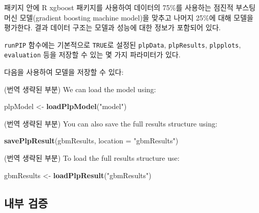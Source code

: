\documentclass[10.5pt]{book}
\newenvironment{Shaded}{\begin{snugshade}}{\end{snugshade}}
\newcommand{\KeywordTok}[1]{\textcolor[rgb]{0.13,0.29,0.53}{\textbf{#1}}}
\newcommand{\DataTypeTok}[1]{\textcolor[rgb]{0.13,0.29,0.53}{#1}}
\newcommand{\StringTok}[1]{\textcolor[rgb]{0.31,0.60,0.02}{#1}}
\newcommand{\OperatorTok}[1]{\textcolor[rgb]{0.81,0.36,0.00}{\textbf{#1}}}
\newcommand{\NormalTok}[1]{#1}
\theoremstyle{definition}
\theoremstyle{definition}
\theoremstyle{definition}
\theoremstyle{remark}
\begin{document}
패키지 안에 R xgboost 패키지를 사용하여 데이터의 75\%를 사용하는 점진적
부스팅 머신 모델(gradient boosting machine model)을 맞추고 나머지 25\%에
대해 모델을 평가한다. 결과 데이터 구조는 모델과 성능에 대한 정보가
포함되어 있다.

\texttt{runPIP} 함수에는 기본적으로 \texttt{TRUE}로 설정된
\texttt{plpData}, \texttt{plpResults}, \texttt{plpplots},
\texttt{evaluation} 등을 저장할 수 있는 몇 가지 파라미터가 있다.

다음을 사용하여 모델을 저장할 수 있다:

\begin{Shaded}
\end{Shaded}

(번역 생략된 부분) We can load the model using:

\begin{Shaded}
\begin{Highlighting}[]
\NormalTok{plpModel <-}\StringTok{ }\KeywordTok{loadPlpModel}\NormalTok{(}\StringTok{"model"}\NormalTok{)}
\end{Highlighting}
\end{Shaded}

(번역 생략된 부분) You can also save the full results structure using:

\begin{Shaded}
\begin{Highlighting}[]
\KeywordTok{savePlpResult}\NormalTok{(gbmResults, }\DataTypeTok{location =} \StringTok{"gbmResults"}\NormalTok{)}
\end{Highlighting}
\end{Shaded}

(번역 생략된 부분) To load the full results structure use:

\begin{Shaded}
\begin{Highlighting}[]
\NormalTok{gbmResults <-}\StringTok{ }\KeywordTok{loadPlpResult}\NormalTok{(}\StringTok{"gbmResults"}\NormalTok{)}
\end{Highlighting}
\end{Shaded}

\subsection{내부 검증}\label{-}
\end{document}
